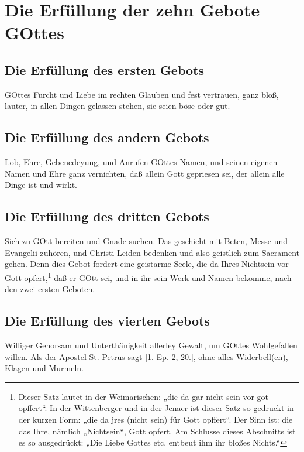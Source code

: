 \section{Die Erfüllung der zehn Gebote GOttes}

\subsection{Die Erfüllung des ersten Gebots}

GOttes Furcht und Liebe im rechten Glauben und fest vertrauen, ganz bloß, lauter, in allen Dingen gelassen stehen, sie seien böse oder gut.

\subsection{Die Erfüllung des andern Gebots}

Lob, Ehre, Gebenedeyung, und Anrufen GOttes Namen, und seinen eigenen Namen und Ehre ganz vernichten, daß allein Gott gepriesen sei, der allein alle Dinge ist und wirkt.

\subsection{Die Erfüllung des dritten Gebots}

Sich zu GOtt bereiten und Gnade suchen. Das geschieht mit Beten, Messe und Evangelii zuhören, und Christi Leiden bedenken und also geistlich zum Sacrament gehen. Denn dies Gebot fordert eine geistarme Seele, die da Ihres Nichtsein vor Gott opfert,\footnote{Dieser Satz lautet in der Weimarischen: „die da gar nicht sein vor got opffert“. In der Wittenberger und in der Jenaer ist dieser Satz so gedruckt in der kurzen Form: „die da jres (nicht sein) für Gott opffert“. Der Sinn ist: die das Ihre, nämlich „Nichtsein“, Gott opfert. Am Schlusse dieses Abschnitts ist es so ausgedrückt: „Die Liebe Gottes etc. entbeut ihm ihr bloßes Nichts.“} daß er GOtt sei, und in ihr sein Werk und Namen bekomme, nach den zwei ersten Geboten.

\subsection{Die Erfüllung des vierten Gebots}

Williger Gehorsam und Unterthänigkeit allerley Gewalt, um GOttes Wohlgefallen willen. Als der Apostel St. Petrus sagt [1. Ep. 2, 20.], ohne alles Widerbell(en), Klagen und Murmeln.

